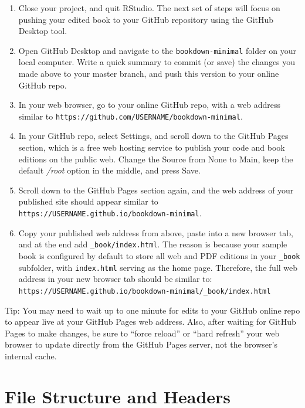 \documentclass[
  english,
]{book}
\begin{document}
\begin{enumerate}
\def\labelenumi{\arabic{enumi}.}
\setcounter{enumi}{10}
\item
  Close your project, and quit RStudio. The next set of steps will focus on pushing your edited book to your GitHub repository using the GitHub Desktop tool.
\item
  Open GitHub Desktop and navigate to the \texttt{bookdown-minimal} folder on your local computer. Write a quick summary to commit (or save) the changes you made above to your master branch, and push this version to your online GitHub repo.
\item
  In your web browser, go to your online GitHub repo, with a web address similar to \texttt{https://github.com/USERNAME/bookdown-minimal}.
\item
  In your GitHub repo, select Settings, and scroll down to the GitHub Pages section, which is a free web hosting service to publish your code and book editions on the public web. Change the Source from None to Main, keep the default \emph{/root} option in the middle, and press Save.
\item
  Scroll down to the GitHub Pages section again, and the web address of your published site should appear similar to \texttt{https://USERNAME.github.io/bookdown-minimal}.
\item
  Copy your published web address from above, paste into a new browser tab, and at the end add \texttt{\_book/index.html}. The reason is because your sample book is configured by default to store all web and PDF editions in your \texttt{\_book} subfolder, with \texttt{index.html} serving as the home page. Therefore, the full web address in your new browser tab should be similar to: \texttt{https://USERNAME.github.io/bookdown-minimal/\_book/index.html}
\end{enumerate}

Tip: You may need to wait up to one minute for edits to your GitHub online repo to appear live at your GitHub Pages web address. Also, after waiting for GitHub Pages to make changes, be sure to ``force reload'' or ``hard refresh'' your web browser to update directly from the GitHub Pages server, not the browser's internal cache.

\hypertarget{structure}{%
\section*{File Structure and Headers}\label{structure}}
\end{document}
